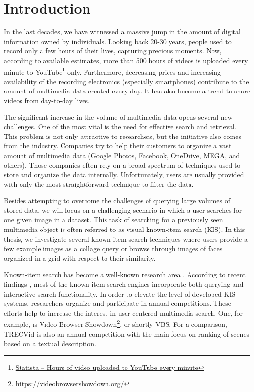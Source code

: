 \chapter*{Introduction}

In the last decades, we have witnessed a massive jump in the amount of digital information owned by individuals. Looking back 20-30 years, people used to record only a few hours of their lives, capturing precious moments. Now, according to available estimates, more than 500 hours of videos is uploaded every minute  to YouTube\footnote{\href{https://www.statista.com/statistics/259477/hours-of-video-uploaded-to-youtube-every-minute/}{Statista -- Hours of video uploaded to YouTube every minute}} only. Furthermore, decreasing prices and increasing availability of the recording electronics (especially smartphones) contribute to the amount of multimedia data created every day. It has also become a trend to share videos from day-to-day lives.

The significant increase in the volume of multimedia data opens several new challenges. One of the most vital is the need for effective search and retrieval. This problem is not only attractive to researchers, but the initiative also comes from the industry. Companies try to help their customers to organize a vast amount of multimedia data (Google Photos, Facebook, OneDrive, MEGA, and others). Those companies often rely on a broad spectrum of techniques used to store and organize the data internally. Unfortunately, users are usually provided with only the most straightforward technique to filter the data.

Besides attempting to overcome the challenges of querying large volumes of stored data, we will focus on a challenging scenario in which a user searches for one given image in a dataset. This task of searching for a previously seen multimedia object is often referred to as visual known-item search (KIS). In this thesis, we investigate several known-item search techniques where users provide a few example images as a collage query or browse through images of faces organized in a grid with respect to their similarity.

Known-item search has become a well-known research area \citep{8352047}. According to recent findings \citep{9037125}, most of the known-item search engines incorporate both querying and interactive search functionality. In order to elevate the level of developed KIS systems, researchers organize and participate in annual competitions. These efforts help to increase the interest in user-centered multimedia search. One, for example, is Video Browser Showdown\footnote{\url{https://videobrowsershowdown.org/}}, or shortly VBS. For a comparison, TRECVid \citep{2019trecvidawad} is also an annual competition with the main focus on ranking of scenes based on a textual description.

